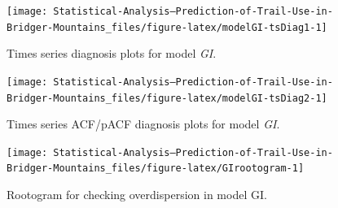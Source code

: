 \documentclass[
]{book}
\newenvironment{Shaded}{\begin{snugshade}}{\end{snugshade}}
\newcommand{\FunctionTok}[1]{\textcolor[rgb]{0.00,0.00,0.00}{#1}}
\newcommand{\NormalTok}[1]{#1}
\newcommand{\OtherTok}[1]{\textcolor[rgb]{0.56,0.35,0.01}{#1}}
\newcommand{\SpecialCharTok}[1]{\textcolor[rgb]{0.00,0.00,0.00}{#1}}
\begin{document}
\begin{figure}

{\centering \texttt{[image: Statistical-Analysis--Prediction-of-Trail-Use-in-Bridger-Mountains\_files/figure-latex/modelGI-tsDiag1-1]} 

}

\caption{Times series diagnosis plots for model \emph{GI}.}\label{fig:modelGI-tsDiag1}
\end{figure}

\begin{figure}

{\centering \texttt{[image: Statistical-Analysis--Prediction-of-Trail-Use-in-Bridger-Mountains\_files/figure-latex/modelGI-tsDiag2-1]} 

}

\caption{Times series ACF/pACF diagnosis plots for model \emph{GI}.}\label{fig:modelGI-tsDiag2}
\end{figure}

\begin{Shaded}
\end{Shaded}

\begin{figure}

{\centering \texttt{[image: Statistical-Analysis--Prediction-of-Trail-Use-in-Bridger-Mountains\_files/figure-latex/GIrootogram-1]} 

}

\caption{Rootogram for checking overdispersion in model GI.}\label{fig:GIrootogram}
\end{figure}
\end{document}
